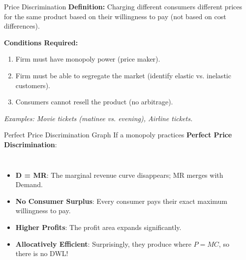 \documentclass[aspectratio=169, 10pt]{beamer}
\begin{document}
\begin{frame}{Price Discrimination}
    \textbf{Definition:} Charging different consumers different prices for the same product based on their willingness to pay (not based on cost differences).
    
    \vspace{0.3cm}
    \textbf{Conditions Required:}
    \begin{enumerate}
        \item Firm must have monopoly power (price maker).
        \item Firm must be able to segregate the market (identify elastic vs. inelastic customers).
        \item Consumers cannot resell the product (no arbitrage).
    \end{enumerate}
    \vspace{0.2cm}
    \textit{Examples: Movie tickets (matinee vs. evening), Airline tickets.}
\end{frame}

\begin{frame}{Perfect Price Discrimination Graph}
    If a monopoly practices \textbf{Perfect Price Discrimination}:
    \begin{columns}
        \begin{itemize}
            \item \textbf{D = MR}: The marginal revenue curve disappears; MR merges with Demand.
            \item \textbf{No Consumer Surplus}: Every consumer pays their exact maximum willingness to pay.
            \item \textbf{Higher Profits}: The profit area expands significantly.
            \item \textbf{Allocatively Efficient}: Surprisingly, they produce where $P=MC$, so there is no DWL!
        \end{itemize}
        
        \begin{center}
        \end{center}
    \end{columns}
\end{frame}
\end{document}
